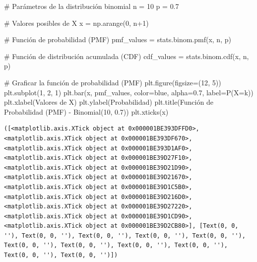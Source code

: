\documentclass[
  letterpaper,
  DIV=11,
  numbers=noendperiod]{scrreprt}
\newenvironment{Shaded}{\begin{snugshade}}{\end{snugshade}}
\newcommand{\CommentTok}[1]{\textcolor[rgb]{0.37,0.37,0.37}{#1}}
\newcommand{\DecValTok}[1]{\textcolor[rgb]{0.68,0.00,0.00}{#1}}
\newcommand{\FloatTok}[1]{\textcolor[rgb]{0.68,0.00,0.00}{#1}}
\newcommand{\NormalTok}[1]{\textcolor[rgb]{0.00,0.23,0.31}{#1}}
\newcommand{\OperatorTok}[1]{\textcolor[rgb]{0.37,0.37,0.37}{#1}}
\newcommand{\StringTok}[1]{\textcolor[rgb]{0.13,0.47,0.30}{#1}}
\begin{document}
\begin{Shaded}
\begin{Highlighting}[]
\CommentTok{\# Parámetros de la distribución binomial}
\NormalTok{n }\OperatorTok{=} \DecValTok{10}
\NormalTok{p }\OperatorTok{=} \FloatTok{0.7}

\CommentTok{\# Valores posibles de X}
\NormalTok{x }\OperatorTok{=}\NormalTok{ np.arange(}\DecValTok{0}\NormalTok{, n}\OperatorTok{+}\DecValTok{1}\NormalTok{)}

\CommentTok{\# Función de probabilidad (PMF)}
\NormalTok{pmf\_values }\OperatorTok{=}\NormalTok{ stats.binom.pmf(x, n, p)}

\CommentTok{\# Función de distribución acumulada (CDF)}
\NormalTok{cdf\_values }\OperatorTok{=}\NormalTok{ stats.binom.cdf(x, n, p)}

\CommentTok{\# Graficar la función de probabilidad (PMF)}
\NormalTok{plt.figure(figsize}\OperatorTok{=}\NormalTok{(}\DecValTok{12}\NormalTok{, }\DecValTok{5}\NormalTok{))}
\NormalTok{plt.subplot(}\DecValTok{1}\NormalTok{, }\DecValTok{2}\NormalTok{, }\DecValTok{1}\NormalTok{)}
\NormalTok{plt.bar(x, pmf\_values, color}\OperatorTok{=}\StringTok{\textquotesingle{}blue\textquotesingle{}}\NormalTok{, alpha}\OperatorTok{=}\FloatTok{0.7}\NormalTok{, label}\OperatorTok{=}\StringTok{\textquotesingle{}P(X=k)\textquotesingle{}}\NormalTok{)}
\NormalTok{plt.xlabel(}\StringTok{\textquotesingle{}Valores de X\textquotesingle{}}\NormalTok{)}
\NormalTok{plt.ylabel(}\StringTok{\textquotesingle{}Probabilidad\textquotesingle{}}\NormalTok{)}
\NormalTok{plt.title(}\StringTok{\textquotesingle{}Función de Probabilidad (PMF) {-} Binomial(10, 0.7)\textquotesingle{}}\NormalTok{)}
\NormalTok{plt.xticks(x)}
\end{Highlighting}
\end{Shaded}

\begin{verbatim}
([<matplotlib.axis.XTick object at 0x000001BE393DFFD0>, <matplotlib.axis.XTick object at 0x000001BE393DF670>, <matplotlib.axis.XTick object at 0x000001BE393D1AF0>, <matplotlib.axis.XTick object at 0x000001BE39D27F10>, <matplotlib.axis.XTick object at 0x000001BE39D21D90>, <matplotlib.axis.XTick object at 0x000001BE39D21670>, <matplotlib.axis.XTick object at 0x000001BE39D1C5B0>, <matplotlib.axis.XTick object at 0x000001BE39D216D0>, <matplotlib.axis.XTick object at 0x000001BE39D27220>, <matplotlib.axis.XTick object at 0x000001BE39D1CD90>, <matplotlib.axis.XTick object at 0x000001BE39D2CB80>], [Text(0, 0, ''), Text(0, 0, ''), Text(0, 0, ''), Text(0, 0, ''), Text(0, 0, ''), Text(0, 0, ''), Text(0, 0, ''), Text(0, 0, ''), Text(0, 0, ''), Text(0, 0, ''), Text(0, 0, '')])
\end{verbatim}
\end{document}
